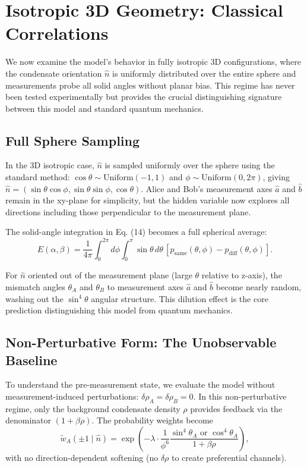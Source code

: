 \documentclass[11pt,a4paper]{article}
\theoremstyle{definition}
\theoremstyle{remark}
\begin{document}
\section{Isotropic 3D Geometry: Classical Correlations}
\label{P8:sec:isotropic_3d}

We now examine the model's behavior in fully isotropic 3D configurations, where the condensate orientation $\hat{n}$ is uniformly distributed over the entire sphere and measurements probe all solid angles without planar bias. This regime has never been tested experimentally but provides the crucial distinguishing signature between this model and standard quantum mechanics.

\subsection{Full Sphere Sampling}

In the 3D isotropic case, $\hat{n}$ is sampled uniformly over the sphere using the standard method: $\cos\theta \sim \mathrm{Uniform}(-1, 1)$ and $\phi \sim \mathrm{Uniform}(0, 2\pi)$, giving $\hat{n} = (\sin\theta\cos\phi, \sin\theta\sin\phi, \cos\theta)$. Alice and Bob's measurement axes $\hat{a}$ and $\hat{b}$ remain in the xy-plane for simplicity, but the hidden variable now explores all directions including those perpendicular to the measurement plane.

The solid-angle integration in Eq. (14) becomes a full spherical average:
\begin{equation}
E(\alpha, \beta) = \frac{1}{4\pi} \int_0^{2\pi} d\phi \int_0^\pi \sin\theta \, d\theta \, [p_{\mathrm{same}}(\theta, \phi) - p_{\mathrm{diff}}(\theta, \phi)].
\label{P8:eq:E_isotropic}
\end{equation}

For $\hat{n}$ oriented out of the measurement plane (large $\theta$ relative to z-axis), the mismatch angles $\theta_A$ and $\theta_B$ to measurement axes $\hat{a}$ and $\hat{b}$ become nearly random, washing out the $\sin^4\theta$ angular structure. This dilution effect is the core prediction distinguishing this model from quantum mechanics.

\subsection{Non-Perturbative Form: The Unobservable Baseline}

To understand the pre-measurement state, we evaluate the model without measurement-induced perturbations: $\delta\rho_A = \delta\rho_B = 0$. In this non-perturbative regime, only the background condensate density $\rho$ provides feedback via the denominator $(1 + \beta\rho)$. The probability weights become
\begin{equation}
\tilde{w}_A(\pm 1 \mid \hat{n}) = \exp\left( -\lambda \cdot \frac{1}{\phi^6} \frac{\sin^4\theta_A \text{ or } \cos^4\theta_A}{1 + \beta\rho} \right),
\label{P8:eq:weight_nonperturbative}
\end{equation}
with no direction-dependent softening (no $\delta\rho$ to create preferential channels).
\end{document}

